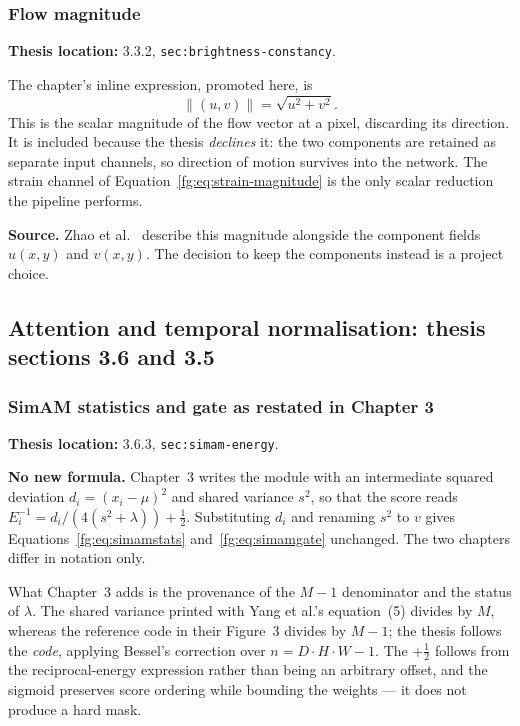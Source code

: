\documentclass[11pt,a4paper]{article}
\numberwithin{equation}{section}
\begin{document}
\subsubsection{Flow magnitude}
\label{fg:flow-magnitude}
\textbf{Thesis location:} 3.3.2, \texttt{sec:brightness-constancy}.

The chapter's inline expression, promoted here, is
\begin{equation}
    \|(u,v)\|=\sqrt{u^2+v^2}.
    \label{fg:eq:flow-magnitude}
\end{equation}
This is the scalar magnitude of the flow vector at a pixel, discarding its
direction. It is included because the thesis \emph{declines} it: the two
components are retained as separate input channels, so direction of motion
survives into the network. The strain channel of
Equation~\eqref{fg:eq:strain-magnitude} is the only scalar reduction the
pipeline performs.

\textbf{Source.} Zhao et al.~\cite{zhaoS2021} describe this magnitude
alongside the component fields $u(x,y)$ and $v(x,y)$. The decision to keep the
components instead is a project choice.

\subsection{Attention and temporal normalisation: thesis sections 3.6 and 3.5}

\subsubsection{SimAM statistics and gate as restated in Chapter 3}
\label{fg:simam-ch3}
\textbf{Thesis location:} 3.6.3, \texttt{sec:simam-energy}.

\textbf{No new formula.} Chapter~3 writes the module with an intermediate
squared deviation $d_i=(x_i-\mu)^2$ and shared variance $s^2$, so that the
score reads $E_i^{-1}=d_i/(4(s^2+\lambda))+\tfrac12$. Substituting $d_i$ and
renaming $s^2$ to $v$ gives Equations~\eqref{fg:eq:simamstats}
and~\eqref{fg:eq:simamgate} unchanged. The two chapters differ in notation
only.

What Chapter~3 adds is the provenance of the $M-1$ denominator and the status
of $\lambda$. The shared variance printed with Yang et al.'s equation~(5)
divides by $M$, whereas the reference code in their Figure~3 divides by
$M-1$; the thesis follows the \emph{code}, applying Bessel's correction over
$n = D \cdot H \cdot W - 1$. The $+\tfrac12$ follows from the
reciprocal-energy expression rather than being an arbitrary offset, and the
sigmoid preserves score ordering while bounding the weights --- it does not
produce a hard mask.
\end{document}
